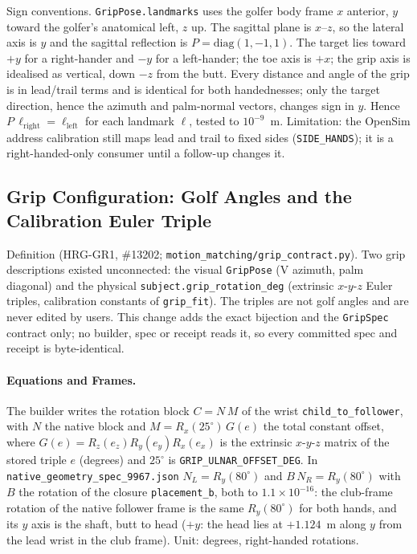 \documentclass[11pt,a4paper]{article}
\begin{document}
Sign conventions. \texttt{GripPose.landmarks} uses the golfer body frame
$x$ anterior, $y$ toward the golfer's anatomical left, $z$ up. The sagittal
plane is $x$--$z$, so the lateral axis is $y$ and the sagittal reflection is
$P=\mathrm{diag}(1,-1,1)$. The target lies toward $+y$ for a right-hander and
$-y$ for a left-hander; the toe axis is $+x$; the grip axis is idealised as
vertical, down $-z$ from the butt. Every distance and angle of the grip is in
lead/trail terms and is identical for both handednesses; only the target
direction, hence the azimuth and palm-normal vectors, changes sign in $y$.
Hence $P\,\ell_{\mathrm{right}}=\ell_{\mathrm{left}}$ for each landmark
$\ell$, tested to $10^{-9}$~m. Limitation: the OpenSim address calibration
still maps lead and trail to fixed sides (\texttt{SIDE\_HANDS}); it is a
right-handed-only consumer until a follow-up changes it.

\subsection{Grip Configuration: Golf Angles and the Calibration Euler Triple}
Definition (HRG-GR1, \#13202; \texttt{motion\_matching/grip\_contract.py}).
Two grip descriptions existed unconnected: the visual \texttt{GripPose}
(V azimuth, palm diagonal) and the physical \texttt{subject.grip\_rotation\_deg}
(extrinsic $x$-$y$-$z$ Euler triples, calibration constants of
\texttt{grip\_fit}). The triples are not golf angles and are never edited by
users. This change adds the exact bijection and the \texttt{GripSpec} contract
only; no builder, spec or receipt reads it, so every committed spec and receipt
is byte-identical.

\paragraph{Equations and Frames.}
The builder writes the rotation block $C=N\,M$ of the wrist
\texttt{child\_to\_follower}, with $N$ the native block and
$M=R_x(25^\circ)\,G(e)$ the total constant offset, where
$G(e)=R_z(e_z)R_y(e_y)R_x(e_x)$ is the extrinsic $x$-$y$-$z$ matrix of the
stored triple $e$ (degrees) and $25^\circ$ is \texttt{GRIP\_ULNAR\_OFFSET\_DEG}.
In \texttt{native\_geometry\_spec\_9967.json}
$N_L=R_y(80^\circ)$ and $B\,N_R=R_y(80^\circ)$ with $B$ the rotation of the
closure \texttt{placement\_b}, both to $1.1\times10^{-16}$: the club-frame
rotation of the native follower frame is the same $R_y(80^\circ)$ for both
hands, and its $y$ axis is the shaft, butt to head ($+y$: the head lies at
$+1.124$~m along $y$ from the lead wrist in the club frame). Unit: degrees,
right-handed rotations.
\end{document}
